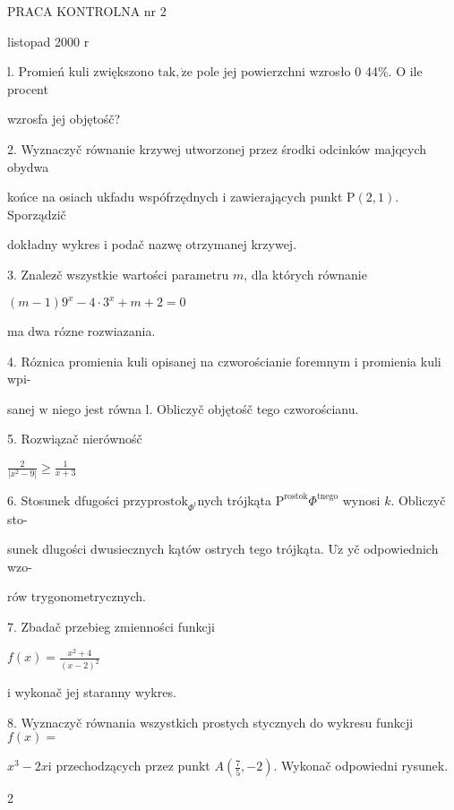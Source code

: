 \documentclass[a4paper,12pt]{article}
\begin{document}
PRACA KONTROLNA nr 2

listopad 2000 $\mathrm{r}$

l. Promień kuli zwiększono $\mathrm{t}\mathrm{a}\mathrm{k}, \dot{\mathrm{z}}\mathrm{e}$ pole jej powierzchni wzrosło $0$ 44\%. $\mathrm{O}$ ile procent

wzrosfa jej objętośč?

2. Wyznaczyč równanie krzywej utworzonej przez środki odcinków majqcych obydwa

końce na osiach ukfadu wspófrzędnych $\mathrm{i}$ zawierających punkt $\mathrm{P}(2,1)$. Sporządzič

dokładny wykres $\mathrm{i}$ podač nazwę otrzymanej krzywej.

3. Znalez$\acute{}$č wszystkie wartości parametru $m$, dla których równanie

$(m-1)9^{x}-4\cdot 3^{x}+m+2=0$

ma dwa rózne rozwiazania.

4. Róznica promienia kuli opisanej na czworościanie foremnym $\mathrm{i}$ promienia kuli wpi-

sanej $\mathrm{w}$ niego jest równa l. Obliczyč objętośč tego czworościanu.

5. Rozwiązač nierównośč

$\displaystyle \frac{2}{|x^{2}-9|}\geq\frac{1}{x+3}$

6. Stosunek dfugości $\mathrm{p}\mathrm{r}\mathrm{z}\mathrm{y}\mathrm{p}\mathrm{r}\mathrm{o}\mathrm{s}\mathrm{t}\mathrm{o}\mathrm{k}_{\Phi^{\mathrm{t}}}$nych trójkąta $\mathrm{P}^{\mathrm{r}\mathrm{o}\mathrm{s}\mathrm{t}\mathrm{o}\mathrm{k}}\Phi^{\mathrm{t}\mathrm{n}\mathrm{e}\mathrm{g}\mathrm{o}}$ wynosi $k$. Obliczyč sto-

sunek dlugości dwusiecznych kątów ostrych tego trójkąta. $\mathrm{U}\dot{\mathrm{z}}$ yč odpowiednich wzo-

rów trygonometrycznych.

7. Zbadač przebieg zmienności funkcji

$f(x)=\displaystyle \frac{x^{2}+4}{(x-2)^{2}}$

$\mathrm{i}$ wykonač jej staranny wykres.

8. Wyznaczyč równania wszystkich prostych stycznych do wykresu funkcji $f(x) =$

$x^{3}-2x\mathrm{i}$ przechodzących przez punkt $A(\displaystyle \frac{7}{5},-2)$. Wykonač odpowiedni rysunek.

2
\end{document}

